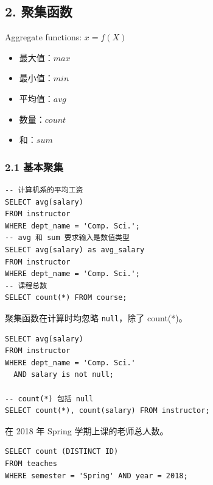 \documentclass[aspectratio=169, 14pt]{beamer}
\begin{document}
\begin{frame}
    \section{\textcolor{darkmidnightblue}{2. 聚集函数}} 
Aggregate functions: $x = f(X)$

\begin{itemize}
    \item 最大值：$max$
    \item 最小值：$min$
    \item 平均值：$avg$
    \item 数量：$count$
    \item 和：$sum$
\end{itemize}

\end{frame}

\begin{frame}[fragile]
    \frametitle{2.1 基本聚集} 
\begin{verbatim}
-- 计算机系的平均工资
SELECT avg(salary)
FROM instructor
WHERE dept_name = 'Comp. Sci.';
-- avg 和 sum 要求输入是数值类型
SELECT avg(salary) as avg_salary
FROM instructor
WHERE dept_name = 'Comp. Sci.';
-- 课程总数
SELECT count(*) FROM course;
\end{verbatim}
\end{frame}

\begin{frame}[fragile]
聚集函数在计算时均忽略 \texttt{null}，除了 \alert{count(*)}。
\begin{verbatim}
SELECT avg(salary)
FROM instructor
WHERE dept_name = 'Comp. Sci.' 
  AND salary is not null;

-- count(*) 包括 null
SELECT count(*), count(salary) FROM instructor;
\end{verbatim}


\end{frame}

\begin{frame}[fragile]
在 2018 年 Spring 学期上课的老师总人数。

\begin{verbatim}
SELECT count (DISTINCT ID)
FROM teaches
WHERE semester = 'Spring' AND year = 2018;
\end{verbatim}


\end{frame}
\end{document}
